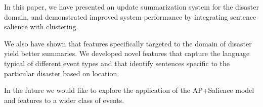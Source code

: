 In this paper, we have presented an update summarization system for the disaster domain,
and demonstrated improved system performance by integrating sentence salience with clustering.



We also have shown that features specifically targeted to the domain of disaster yield better summaries. We developed novel features that capture the language typical of different event types and that identify sentences specific to the particular disaster based on location.

In the future we would like to explore the application of the AP+Salience
 model and features
to a wider class of events. 


